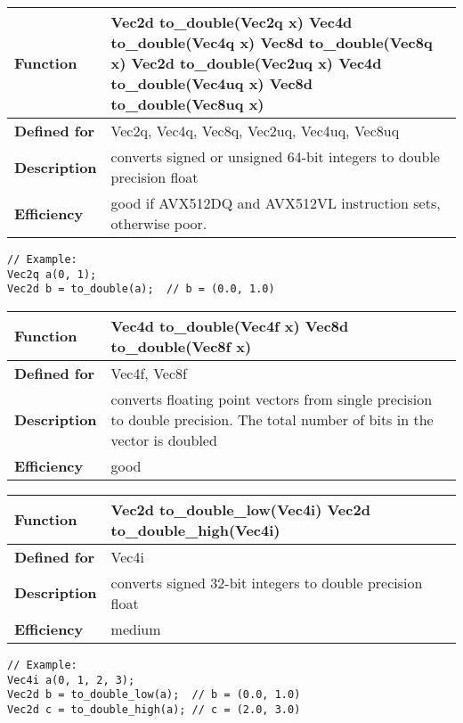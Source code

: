 \documentclass[vcl_manual.tex]{subfiles}
\begin{document}
\begin{tabular}{|p{30mm}|p{120mm}|}
\hline
\bfseries Function & 
Vec2d to\_double(Vec2q x) \newline
Vec4d to\_double(Vec4q x) \newline
Vec8d to\_double(Vec8q x) \newline 
Vec2d to\_double(Vec2uq x) \newline
Vec4d to\_double(Vec4uq x) \newline
Vec8d to\_double(Vec8uq x) \\ \hline
\bfseries Defined for & Vec2q, Vec4q, Vec8q, Vec2uq, Vec4uq, Vec8uq \\ \hline
\bfseries Description & converts signed or unsigned 64-bit integers to double precision float \\ \hline
\bfseries Efficiency & good if AVX512DQ and AVX512VL instruction sets, otherwise poor. \\ \hline
\end{tabular}
\begin{lstlisting}[frame=none]
// Example:
Vec2q a(0, 1);
Vec2d b = to_double(a);  // b = (0.0, 1.0)
\end{lstlisting}


\begin{tabular}{|p{30mm}|p{120mm}|}
\hline
\bfseries Function & 
Vec4d to\_double(Vec4f x) \newline
Vec8d to\_double(Vec8f x) \\ \hline
\bfseries Defined for & Vec4f, Vec8f \\ \hline
\bfseries Description & converts floating point vectors from single precision to double precision. The total number of bits in the vector is doubled \\ \hline
\bfseries Efficiency & good  \\ \hline
\end{tabular}


\begin{tabular}{|p{30mm}|p{120mm}|}
\hline
\bfseries Function & 
Vec2d to\_double\_low(Vec4i) \newline
Vec2d to\_double\_high(Vec4i) \\ \hline
\bfseries Defined for & Vec4i \\ \hline
\bfseries Description & converts signed 32-bit integers to double precision float \\ \hline
\bfseries Efficiency & medium \\ \hline
\end{tabular}
\begin{lstlisting}[frame=none]
// Example:
Vec4i a(0, 1, 2, 3);
Vec2d b = to_double_low(a);  // b = (0.0, 1.0)
Vec2d c = to_double_high(a); // c = (2.0, 3.0)
\end{lstlisting}
\end{document}
